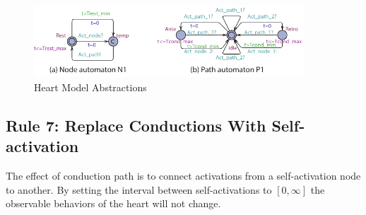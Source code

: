 \begin{figure}[!h]
		\centering
		\includegraphics[width=0.9\textwidth]{figs/rule5.pdf}
		\caption{\small Heart Model Abstractions}
		\label{fig:rule5}
\end{figure}

\subsection{Rule 7: Replace Conductions With Self-activation}
The effect of conduction path is to connect activations from a self-activation node to another. By setting the interval between self-activations to $[0,\infty]$ the observable behaviors of the heart will not change.

